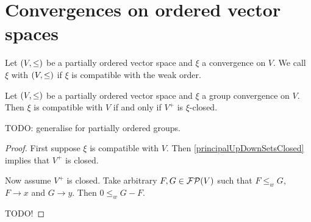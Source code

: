 \section{Convergences on ordered vector spaces}
\begin{definition}
Let $\sSet{V, \leq}$ be a partially ordered vector space and $\xi$ a convergence on $V$. We call $\xi$  with $\sSet{V,\leq}$ if $\xi$ is compatible with the weak order.
\end{definition}

\begin{proposition}
Let $\sSet{V, \leq}$ be a partially ordered vector space and $\xi$ a group convergence on $V$. Then $\xi$ is compatible with $V$ \textup{if and only if} $V^+$ is $\xi$-closed.
\end{proposition}
TODO: generalise for partially ordered groups.
\begin{proof}
First suppose $\xi$ is compatible with $V$. Then \ref{principalUpDownSetsClosed} implies that $V^+$ is closed.

Now assume $V^+$ is closed. Take arbitrary $F,G\in \operatorname{\mathcal{FP}}(V)$ such that $F\leq_w G$, $F\to x$ and $G\to y$. Then $0\leq_w G-F$.

TODO!
\end{proof}

